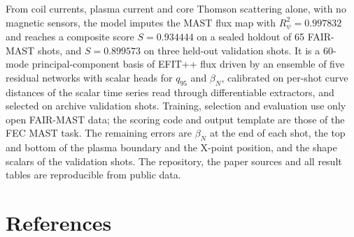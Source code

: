 \documentclass[11pt,a4paper]{article}
\numberwithin{equation}{section}
\begin{document}
From coil currents, plasma current and core Thomson scattering alone, with no magnetic sensors, the model imputes the MAST flux map with \(R^2_\psi=0.997832\) and reaches a composite score \(S=0.934444\) on a sealed holdout of 65 FAIR-MAST shots, and \(S=0.899573\) on three held-out validation shots. It is a 60-mode principal-component basis of EFIT++ flux driven by an ensemble of five residual networks with scalar heads for \(q_{95}\) and \(\beta_N\), calibrated on per-shot curve distances of the scalar time series read through differentiable extractors, and selected on archive validation shots. Training, selection and evaluation use only open FAIR-MAST data; the scoring code and output template are those of the FEC MAST task. The remaining errors are \(\beta_N\) at the end of each shot, the top and bottom of the plasma boundary and the X-point position, and the shape scalars of the validation shots. The repository, the paper sources and all result tables are reproducible from public data.

\hypertarget{references}{%
\section*{References}}



\end{document}
